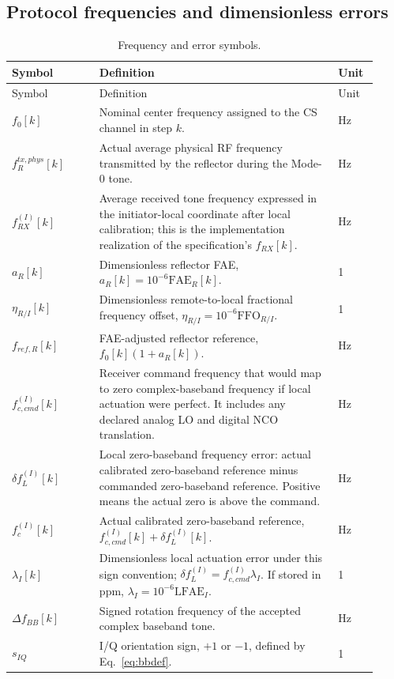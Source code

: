 \documentclass[10pt,a4paper]{article}
\newcommand{\FFO}{\mathrm{FFO}}
\newcommand{\FAE}{\mathrm{FAE}}
\newcommand{\LFAE}{\mathrm{LFAE}}
\begin{document}
\subsection{Protocol frequencies and dimensionless errors}
\begin{longtable}{@{}p{0.22\linewidth}p{0.60\linewidth}p{0.10\linewidth}@{}}
\caption{Frequency and error symbols.}\\
\toprule Symbol & Definition & Unit \\
\midrule\endfirsthead
\toprule Symbol & Definition & Unit \\
\midrule\endhead
$f_0[k]$ & Nominal center frequency assigned to the CS channel in step $k$. & Hz\\
$f_R^{tx,phys}[k]$ & Actual average physical RF frequency transmitted by the reflector during the Mode-0 tone. & Hz\\
$f_{RX}^{(I)}[k]$ & Average received tone frequency expressed in the initiator-local coordinate after local calibration; this is the implementation realization of the specification's $f_{RX}[k]$. & Hz\\
$a_R[k]$ & Dimensionless reflector FAE, $a_R[k]=10^{-6}\FAE_R[k]$. & 1\\
$\eta_{R/I}[k]$ & Dimensionless remote-to-local fractional frequency offset, $\eta_{R/I}=10^{-6}\FFO_{R/I}$. & 1\\
$f_{ref,R}[k]$ & FAE-adjusted reflector reference, $f_0[k](1+a_R[k])$. & Hz\\
$f_{c,cmd}^{(I)}[k]$ & Receiver command frequency that would map to zero complex-baseband frequency if local actuation were perfect. It includes any declared analog LO and digital NCO translation. & Hz\\
$\delta f_L^{(I)}[k]$ & Local zero-baseband frequency error: actual calibrated zero-baseband reference minus commanded zero-baseband reference. Positive means the actual zero is above the command. & Hz\\
$f_c^{(I)}[k]$ & Actual calibrated zero-baseband reference, $f_{c,cmd}^{(I)}[k]+\delta f_L^{(I)}[k]$. & Hz\\
$\lambda_I[k]$ & Dimensionless local actuation error under this sign convention; $\delta f_L^{(I)}=f_{c,cmd}^{(I)}\lambda_I$. If stored in ppm, $\lambda_I=10^{-6}\LFAE_I$. & 1\\
$\Delta f_{BB}[k]$ & Signed rotation frequency of the accepted complex baseband tone. & Hz\\
$s_{IQ}$ & I/Q orientation sign, $+1$ or $-1$, defined by Eq.~\ref{eq:bbdef}. & 1\\
\bottomrule
\end{longtable}
\end{document}
